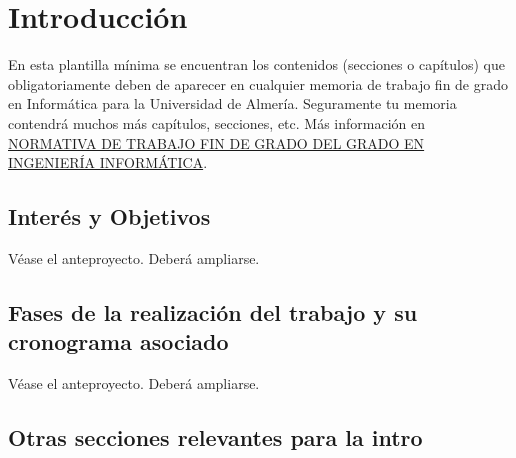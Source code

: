 \chapter{Introducción}
\label{intro}

En esta plantilla mínima se encuentran los contenidos (secciones o
capítulos) que obligatoriamente deben de aparecer en cualquier memoria
de trabajo fin de grado en Informática para la Universidad de
Almería. Seguramente tu memoria contendrá muchos más capítulos,
secciones, etc. Más información en
\href{http://cms.ual.es/idc/groups/public/@academica/@titulaciones/@centro/@politecnica/documents/documento/normativa_tfg_4010.pdf}{NORMATIVA
  DE TRABAJO FIN DE GRADO DEL GRADO EN INGENIERÍA INFORMÁTICA}.

\section{Interés y Objetivos}

Véase el anteproyecto. Deberá ampliarse.

\section{Fases de la realización del trabajo y su 
cronograma asociado}

Véase el anteproyecto. Deberá ampliarse.

\section{Otras secciones relevantes para la intro}
